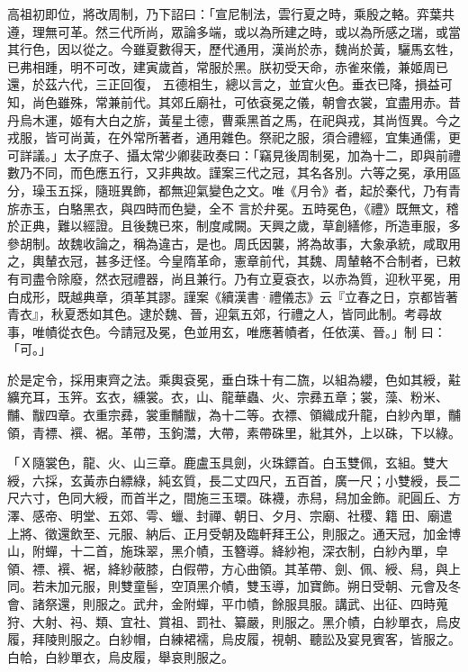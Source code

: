 
\begin{pinyinscope}

 高祖初即位，將改周制，乃下詔曰：「宣尼制法，雲行夏之時，乘殷之輅。弈葉共遵，理無可革。然三代所尚，眾論多端，或以為所建之時，或以為所感之瑞，或當其行色，因以從之。今雖夏數得天，歷代通用，漢尚於赤，魏尚於黃，驪馬玄牲，已弗相踵，明不可改，建寅歲首，常服於黑。朕初受天命，赤雀來儀，兼姬周已還，於茲六代，三正回復，
 五德相生，總以言之，並宜火色。垂衣已降，損益可知，尚色雖殊，常兼前代。其郊丘廟社，可依袞冕之儀，朝會衣裳，宜盡用赤。昔丹烏木運，姬有大白之旂，黃星土德，曹乘黑首之馬，在祀與戎，其尚恆異。今之戎服，皆可尚黃，在外常所著者，通用雜色。祭祀之服，須合禮經，宜集通儒，更可詳議。」太子庶子、攝太常少卿裴政奏曰：「竊見後周制冕，加為十二，即與前禮數乃不同，而色應五行，又非典故。謹案三代之冠，其名各別。六等之冕，承用區分，璪玉五採，隨班異飾，都無迎氣變色之文。唯《月令》者，起於秦代，乃有青旂赤玉，白駱黑衣，與四時而色變，全不
 言於弁冕。五時冕色，《禮》既無文，稽於正典，難以經證。且後魏已來，制度咸闕。天興之歲，草創繕修，所造車服，多參胡制。故魏收論之，稱為違古，是也。周氏因襲，將為故事，大象承統，咸取用之，輿輦衣冠，甚多迂怪。今皇隋革命，憲章前代，其魏、周輦輅不合制者，已敕有司盡令除廢，然衣冠禮器，尚且兼行。乃有立夏袞衣，以赤為質，迎秋平冕，用白成形，既越典章，須革其謬。謹案《續漢書·禮儀志》云『立春之日，京都皆著青衣』，秋夏悉如其色。逮於魏、晉，迎氣五郊，行禮之人，皆同此制。考尋故事，唯幘從衣色。今請冠及冕，色並用玄，唯應著幘者，任依漢、晉。」制
 曰：「可。」



 於是定令，採用東齊之法。乘輿袞冕，垂白珠十有二旒，以組為纓，色如其綬，黈纊充耳，玉笄。玄衣，纁裳。衣，山、龍華蟲、火、宗彞五章；裳，藻、粉米、黼、黻四章。衣重宗彞，裳重黼黻，為十二等。衣褾、領織成升龍，白紗內單，黼領，青褾、襈、裾。革帶，玉鉤灊，大帶，素帶硃里，紕其外，上以硃，下以綠。



 「Ｘ隨裳色，龍、火、山三章。鹿盧玉具劍，火珠鏢首。白玉雙佩，玄組。雙大綬，六採，玄黃赤白縹綠，純玄質，長二丈四尺，五百首，廣一尺；小雙綬，長二尺六寸，色同大綬，而首半之，間施三玉環。硃襪，赤舄，舄加金飾。祀圓丘、方澤、感帝、明堂、五郊、雩、蠟、封禪、朝日、夕月、宗廟、社稷、籍
 田、廟遣上將、徵還飲至、元服、納后、正月受朝及臨軒拜王公，則服之。通天冠，加金博山，附蟬，十二首，施珠翠，黑介幘，玉簪導。絳紗袍，深衣制，白紗內單，皁領、褾、襈、裾，絳紗蔽膝，白假帶，方心曲領。其革帶、劍、佩、綬、舄，與上同。若未加元服，則雙童髻，空頂黑介幘，雙玉導，加寶飾。朔日受朝、元會及冬會、諸祭還，則服之。武弁，金附蟬，平巾幘，餘服具服。講武、出征、四時蒐狩、大射、祃、類、宜社、賞祖、罰社、纂嚴，則服之。黑介幘，白紗單衣，烏皮履，拜陵則服之。白紗帽，白練裙襦，烏皮履，視朝、聽訟及宴見賓客，皆服之。白帢，白紗單衣，烏皮履，舉哀則服之。




\end{pinyinscope}
